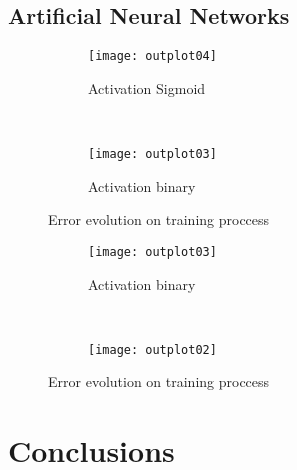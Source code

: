\documentclass[11pt,spanish,listoffigures,listoftables]{tfgetsinf}
\begin{document}
\section{Artificial Neural Networks}
\begin{figure}[h!]
    \centering
    \begin{subfigure}[b]{0.8\textwidth}
        \texttt{[image: outplot04]}
        \caption{Activation Sigmoid}
        \label{fig:Sigmoid}
    \end{subfigure}
    ~ %
    \begin{subfigure}[b]{0.8\textwidth}
        \texttt{[image: outplot03]}
        \caption{Activation binary}
        \label{fig:binary}
    \end{subfigure}
    \caption{Error evolution on training proccess}\label{fig:ann}
\end{figure}
\begin{figure}
    \centering
    \begin{subfigure}[b]{0.8\textwidth}
        \texttt{[image: outplot03]}
        \caption{Activation binary}
        \label{fig:binary}
    \end{subfigure}
    ~ %
    \begin{subfigure}[b]{0.8\textwidth}
        \texttt{[image: outplot02]}
        \caption{}
        \label{fig:Sigmoid}
    \end{subfigure}
    \caption{Error evolution on training proccess}\label{fig:ann}
\end{figure}


\chapter{Conclusions}
\end{document}
